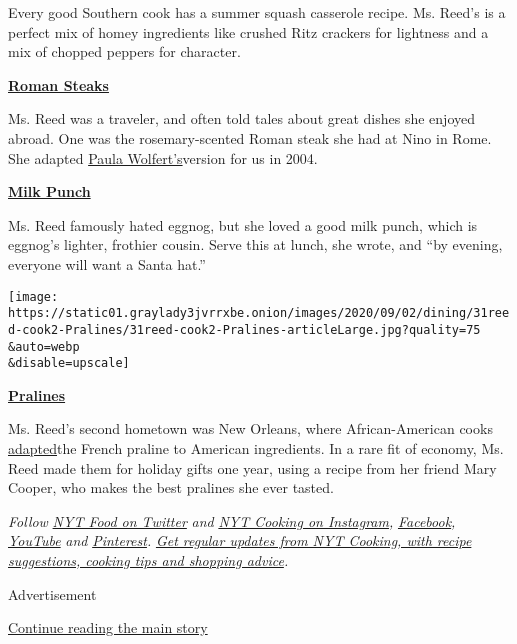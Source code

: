 Every good Southern cook has a summer squash casserole recipe. Ms.
Reed's is a perfect mix of homey ingredients like crushed Ritz crackers
for lightness and a mix of chopped peppers for character.

\textbf{\href{https://cooking.nytimes3xbfgragh.onion/recipes/6970-roman-steaks}{Roman
Steaks}}

Ms. Reed was a traveler, and often told tales about great dishes she
enjoyed abroad. One was the rosemary-scented Roman steak she had at Nino
in Rome. She adapted
\href{https://www.nytimes3xbfgragh.onion/2017/03/21/dining/paula-wolfert-alzheimers.html}{Paula
Wolfert's}version for us in 2004.

\textbf{\href{https://cooking.nytimes3xbfgragh.onion/recipes/1801-milk-punch}{Milk
Punch}}

Ms. Reed famously hated eggnog, but she loved a good milk punch, which
is eggnog's lighter, frothier cousin. Serve this at lunch, she wrote,
and ``by evening, everyone will want a Santa hat.''

\texttt{[image: https://static01.graylady3jvrrxbe.onion/images/2020/09/02/dining/31reed-cook2-Pralines/31reed-cook2-Pralines-articleLarge.jpg?quality=75\\\&auto=webp\\\&disable=upscale]}

\textbf{\href{https://cooking.nytimes3xbfgragh.onion/recipes/1746-pralines}{Pralines}}

Ms. Reed's second hometown was New Orleans, where African-American cooks
\href{https://www.eater.com/2016/10/27/13422426/praline-new-orleans-pecan-candy}{adapted}the
French praline to American ingredients. In a rare fit of economy, Ms.
Reed made them for holiday gifts one year, using a recipe from her
friend Mary Cooper, who makes the best pralines she ever tasted.

\emph{Follow} \href{https://twitter.com/nytfood}{\emph{NYT Food on
Twitter}} \emph{and}
\href{https://www.instagram.com/nytcooking/}{\emph{NYT Cooking on
Instagram}}\emph{,}
\href{https://www.facebookcorewwwi.onion/nytcooking/}{\emph{Facebook}}\emph{,}
\href{https://www.youtube.com/nytcooking}{\emph{YouTube}} \emph{and}
\href{https://www.pinterest.com/nytcooking/}{\emph{Pinterest}}\emph{.}
\href{https://www.nytimes3xbfgragh.onion/newsletters/cooking}{\emph{Get
regular updates from NYT Cooking, with recipe suggestions, cooking tips
and shopping advice}}\emph{.}

Advertisement

\protect\hyperlink{after-bottom}{Continue reading the main story}

